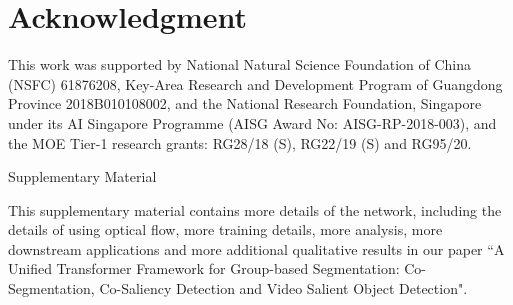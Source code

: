 \documentclass[journal]{IEEEtran}
\begin{document}
\section*{Acknowledgment}

This work was supported by National Natural Science Foundation of China (NSFC) 61876208, Key-Area Research and Development Program of Guangdong Province 2018B010108002, and the National Research Foundation, Singapore under its AI Singapore Programme (AISG Award No: AISG-RP-2018-003), and the MOE Tier-1 research grants: RG28/18 (S), RG22/19 (S) and RG95/20.







\ifCLASSOPTIONcaptionsoff
  \newpage
\fi















































\clearpage
\renewcommand\appendixname{}
\appendix
\vspace{-15pt}
\noindent \Large Supplementary Material
\normalsize

\vspace{1ex}

This supplementary material contains more details of the network, including the details of using optical flow, more training details, more analysis, more downstream applications and more additional qualitative results in our paper “A Unified Transformer Framework for Group-based Segmentation: Co-Segmentation, Co-Saliency Detection and Video Salient Object Detection".
\end{document}

